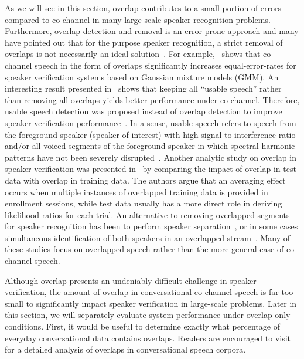 As we will see in this section, overlap contributes to a small portion of errors compared to co-channel in many large-scale speaker recognition problems. 
Furthermore, overlap detection and removal is an error-prone approach and many have pointed out that for the purpose speaker recognition, a strict removal of overlaps is not necessarily an ideal solution~\cite{smolenski_tut}. 
For example,~\cite{yantorno_report} shows that co-channel speech in the form of overlaps significantly increases equal-error-rates for speaker verification systems based on Gaussian mixture models (GMM). 
An interesting result presented in~\cite{yantorno_report} shows that keeping all ``usable speech'' rather than removing all overlaps yields better performance under co-channel.  
Therefore, usable speech detection was proposed instead of overlap detection to improve speaker verification performance~\cite{Dwang_03, Dwang_03_trans}. 
In a sense, usable speech refers to speech from the foreground speaker (speaker of interest) with high signal-to-interference ratio and/or all voiced segments of the foreground speaker in which spectral harmonic patterns have not been severely disrupted~\cite{smolenski_tut}. 
Another analytic study on overlap in speaker verification was presented in~\cite{navid_pyknogram_jp} by comparing the impact of overlap in test data with overlap in training data. 
The authors argue that an averaging effect occurs when multiple instances of overlapped training data is provided in enrollment sessions, while test data usually has a more direct role in deriving likelihood ratios for each trial. 
An alternative to removing overlapped segments for speaker recognition has been to perform speaker separation~\cite{saeidi2010signal, mowlaee2010joint}, or in some cases simultaneous identification of both speakers in an overlapped stream~\cite{zhao2015cochannel, sadjadi_heck_icassp14}. 
Many of these studies focus on overlapped speech rather than the more general case of co-channel speech. 

Although overlap presents an undeniably difficult challenge in speaker verification, the amount of overlap in conversational co-channel speech is far too small to significantly impact speaker verification in large-scale problems. 
Later in this section, we will separately evaluate system performance under overlap-only conditions. 
First, it would be useful to determine exactly what percentage of everyday conversational data contains overlaps. 
Readers are encouraged to visit~\cite{shriberg_01} for a detailed analysis of overlaps in conversational speech corpora. 

